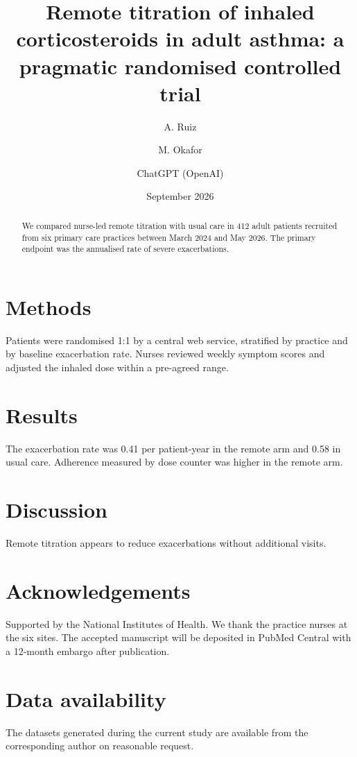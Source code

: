 \documentclass[11pt]{article}
\title{Remote titration of inhaled corticosteroids in adult asthma:
a pragmatic randomised controlled trial}
\author{A. Ruiz \and M. Okafor \and ChatGPT (OpenAI)}
\date{September 2026}
\begin{document}
\maketitle

\begin{abstract}
We compared nurse-led remote titration with usual care in 412 adult patients
recruited from six primary care practices between March 2024 and May 2026.
The primary endpoint was the annualised rate of severe exacerbations.
\end{abstract}

\section{Methods}
Patients were randomised 1:1 by a central web service, stratified by practice
and by baseline exacerbation rate. Nurses reviewed weekly symptom scores and
adjusted the inhaled dose within a pre-agreed range.

\section{Results}
The exacerbation rate was 0.41 per patient-year in the remote arm and 0.58 in
usual care. Adherence measured by dose counter was higher in the remote arm.

\section{Discussion}
Remote titration appears to reduce exacerbations without additional visits.

\section*{Acknowledgements}
Supported by the National Institutes of Health. We thank the practice nurses
at the six sites. The accepted manuscript will be deposited in PubMed Central
with a 12-month embargo after publication.

\section*{Data availability}
The datasets generated during the current study are available from the
corresponding author on reasonable request.
\end{document}

